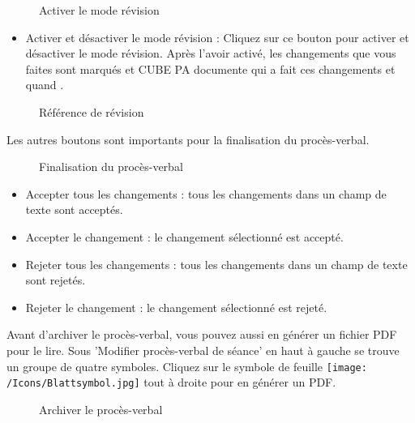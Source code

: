 \begin{figure}[H]
\caption{Activer le mode révision}
\end{figure}

\begin{itemize}
\item
Activer et désactiver le mode révision  : Cliquez sur ce bouton pour activer et désactiver le mode révision. Après l'avoir activé, les changements que vous faites sont marqués  et CUBE PA documente qui a fait ces changements et quand .
\end{itemize}

\begin{figure}[H]
\caption{Référence de révision}
\end{figure}

Les autres boutons sont importants pour la finalisation du procès-verbal.

\begin{figure}[H]
\caption{Finalisation du procès-verbal}
\end{figure}

\begin{itemize}
\item
Accepter tous les changements  : tous les changements dans un champ de texte sont acceptés.
\item
Accepter le changement  : le changement sélectionné est accepté.
\item
Rejeter tous les changements  : tous les changements dans un champ de texte sont rejetés.
\item
Rejeter le changement  : le changement sélectionné est rejeté.
\end{itemize}

\vspace{\baselineskip}

Avant d'archiver le procès-verbal, vous pouvez aussi en générer un fichier PDF pour le lire. Sous 'Modifier procès-verbal de séance' en haut à gauche se trouve un groupe de quatre symboles. Cliquez sur le symbole de feuille \texttt{[image: /Icons/Blattsymbol.jpg]}  tout à droite pour en générer un PDF.

\begin{figure}[H]
\caption{Archiver le procès-verbal}
\end{figure}

